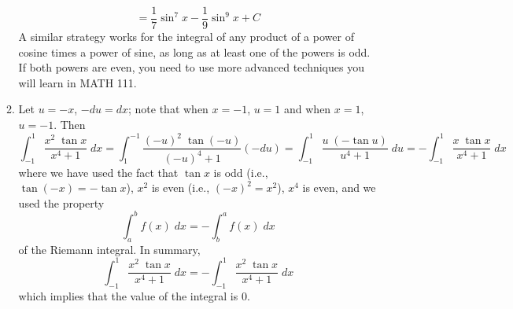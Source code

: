 \documentclass{article}
\begin{document}
\begin{enumerate}
\begin{enumerate}
\begin{equation*}
      = \frac{1}{7} \sin^7 x - \frac{1}{9} \sin^9 x + C
    \end{equation*}
    A similar strategy works for the integral of any product of a
    power of cosine times a power of sine, as long as at least one of
    the powers is odd.  If both powers are even, you need to use more
    advanced techniques you will learn in MATH 111.
  \item Let $u=-x$, $-du=dx$; note that when $x=-1$, $u=1$ and when
    $x=1$, $u=-1$.  Then
    \begin{equation*}
      \int_{-1}^1 \frac{x^2\; \tan x}{x^4+1} \; dx
      = \int_{1}^{-1} \frac{(-u)^2 \; \tan (-u)}{(-u)^4+1} (-du)
      = \int_{-1}^1 \frac{u\;(- \tan u)}{u^4+1} \; du
      = -\int_{-1}^1 \frac{ x\; \tan x}{x^4+1} \; dx
    \end{equation*}
    where we have used the fact that $\tan x$ is odd (i.e.,
    $\tan(-x) = -\tan x$), $x^2$ is even (i.e., $(-x)^2 = x^2$), $x^4$
    is even, and we used the property
    \begin{equation*}
      \int_a^b f(x) \; dx = -\int_b^a f(x) \; dx
    \end{equation*}
    of the Riemann integral.  In summary,
    \begin{equation*}
      \int_{-1}^1 \frac{x^2 \; \tan x}{x^4+1} \; dx
      = -\int_{-1}^1 \frac{x^2\; \tan x}{x^4+1} \; dx
    \end{equation*}
    which implies that the value of the integral is $0$.


\end{enumerate}
\end{enumerate}
\end{document}
